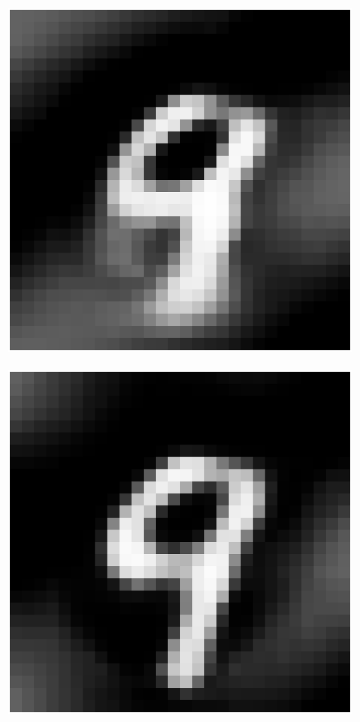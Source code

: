 \documentclass{article} %
\begin{document}
\begin{figure}
\begin{subfigure}{0.22\textwidth}
\end{subfigure}
\hfill
\begin{subfigure}{0.22\textwidth}
\includegraphics[width = \textwidth]{figures-MNIST/llow0.eps}
\end{subfigure}
\hfill
\begin{subfigure}{0.22\textwidth}
\includegraphics[width = \textwidth]{figures-MNIST/llow1.eps}

\end{subfigure}
\end{figure}
\end{document}
